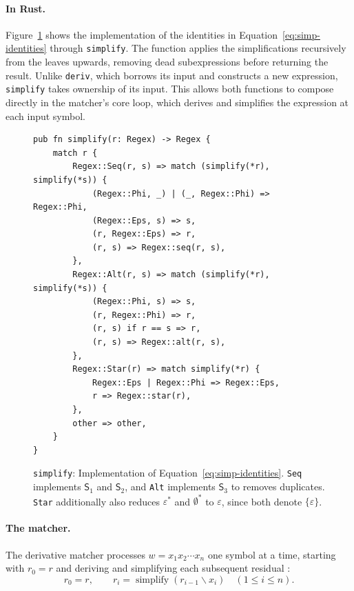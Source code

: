%

\paragraph{In Rust.}
Figure~\ref{fig:simplify-rust} shows the implementation 
of the identities in Equation~\eqref{eq:simp-identities} through \texttt{simplify}. 
The function applies the simplifications recursively 
from the leaves upwards, removing dead subexpressions
before returning the result. 
Unlike \texttt{deriv}, which borrows its input and constructs a new expression, 
\texttt{simplify} takes ownership of its input. 
This allows both functions to compose directly in the matcher's core loop, 
which derives and simplifies the expression at each input symbol.

\begin{figure}[ht]
\small
\begin{verbatim}
pub fn simplify(r: Regex) -> Regex {
    match r {
        Regex::Seq(r, s) => match (simplify(*r), simplify(*s)) {
            (Regex::Phi, _) | (_, Regex::Phi) => Regex::Phi,
            (Regex::Eps, s) => s,
            (r, Regex::Eps) => r,
            (r, s) => Regex::seq(r, s),
        },
        Regex::Alt(r, s) => match (simplify(*r), simplify(*s)) {
            (Regex::Phi, s) => s,
            (r, Regex::Phi) => r,
            (r, s) if r == s => r,
            (r, s) => Regex::alt(r, s),
        },
        Regex::Star(r) => match simplify(*r) {
            Regex::Eps | Regex::Phi => Regex::Eps,
            r => Regex::star(r),
        },
        other => other,
    }
}
\end{verbatim}
\caption{\texttt{simplify}:
Implementation of Equation~\eqref{eq:simp-identities}.
\texttt{Seq} implements
$\mathsf{S}_{1}$ and $\mathsf{S}_{2}$, 
and \texttt{Alt} implements $\mathsf{S}_{3}$ to removes duplicates. 
\texttt{Star} additionally also reduces $\varepsilon^{*}$ and $\emptyset^{*}$ 
to $\varepsilon$, since both denote $\{\varepsilon\}$.}
\label{fig:simplify-rust}
\end{figure}

%
%
%

\paragraph{The matcher.}
\label{sec:derivative-matcher}

The derivative matcher processes $w=x_1x_2\cdots x_n$ one symbol at a time, 
starting with $r_0=r$ and deriving and simplifying each subsequent residual
\citep[p.5]{sulzmann_slides}:
\begin{equation}
r_0=r,
\qquad
r_i=\operatorname{simplify}(r_{i-1}\backslash x_i)
\quad (1\leq i\leq n).
\label{eq:derivative-residuals}
\end{equation}

